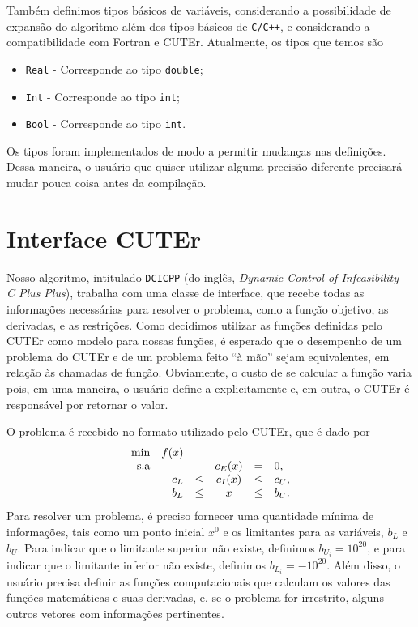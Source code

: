 Também definimos tipos básicos de variáveis, considerando a possibilidade
de expansão do algoritmo além dos tipos básicos de \verb-C/C++-, e considerando
a compatibilidade com Fortran e CUTEr.
Atualmente, os tipos que temos são
\begin{itemize}
  \item \verb+Real+ - Corresponde ao tipo \verb+double+;
  \item \verb+Int+  - Corresponde ao tipo \verb+int+;
  \item \verb+Bool+ - Corresponde ao tipo \verb+int+.
\end{itemize}
Os tipos foram implementados de modo a permitir mudanças nas definições. Dessa
maneira, o usuário que quiser utilizar alguma precisão diferente precisará
mudar pouca coisa antes da compilação.

\section{Interface CUTEr}

Nosso algoritmo, intitulado \verb+DCICPP+ (do inglês, {\it Dynamic Control of
Infeasibility - C Plus Plus}), trabalha com uma classe de interface,
que recebe todas as informações necessárias para resolver o problema, como a
função objetivo, as derivadas, e as restrições.
Como decidimos utilizar as funções definidas pelo CUTEr como modelo para nossas
funções, é esperado que o desempenho de um problema do CUTEr e de um
problema feito ``à mão'' sejam equivalentes, em relação às chamadas de função.
Obviamente, o custo de se calcular a função varia pois, em uma maneira, o
usuário define-a explicitamente e, em outra, o CUTEr é responsável por retornar
o valor.

O problema é recebido no formato utilizado pelo CUTEr, que é dado por
\begin{equation} \visiblelbl{prob:geral_cuter_local}
\begin{array}{rrrcll}
\min       & f(x) \\
\mbox{s.a} &     &      & c_E(x) &   =  & 0, \\
           & c_L & \leq & c_I(x) & \leq & c_U, \\
           & b_L & \leq &     x  & \leq & b_U.
\end{array}
\end{equation}
Para resolver um problema, é preciso fornecer uma quantidade mínima de
informações, tais como um ponto inicial $x^0$ e os limitantes para as variáveis,
$b_L$ e $b_U$. 
Para indicar que o limitante superior não existe, definimos $b_{U_i} = 10^{20}$,
e para indicar que o limitante inferior não existe, definimos $b_{L_i} =
-10^{20}$. Além disso, o usuário precisa definir as funções computacionais que
calculam os valores das funções matemáticas e suas derivadas, e, se o problema
for irrestrito, alguns outros vetores com informações pertinentes.

